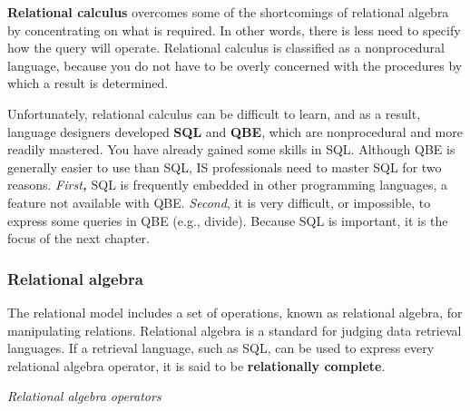 \documentclass[
]{article}
\begin{document}
\textbf{Relational calculus} overcomes some of the shortcomings of relational
algebra by concentrating on what is required. In other words, there is
less need to specify how the query will operate. Relational calculus is
classified as a nonprocedural language, because you do not have to be
overly concerned with the procedures by which a result is determined.

Unfortunately, relational calculus can be difficult to learn, and as a
result, language designers developed \textbf{SQL} and \textbf{QBE}, which are
nonprocedural and more readily mastered. You have already gained some
skills in SQL. Although QBE is generally easier to use than SQL, IS
professionals need to master SQL for two reasons. \emph{First\textbf{,}} SQL is
frequently embedded in other programming languages, a feature not
available with QBE. \emph{Second}, it is very difficult, or impossible, to
express some queries in QBE (e.g., divide). Because SQL is important, it
is the focus of the next chapter.

\hypertarget{relational-algebra}{%
\subsubsection*{Relational algebra}\label{relational-algebra}}

The relational model includes a set of operations, known as relational
algebra, for manipulating relations. Relational algebra is a standard
for judging data retrieval languages. If a retrieval language, such as
SQL, can be used to express every relational algebra operator, it is
said to be \textbf{relationally complete}.

\emph{Relational algebra operators}
\end{document}
